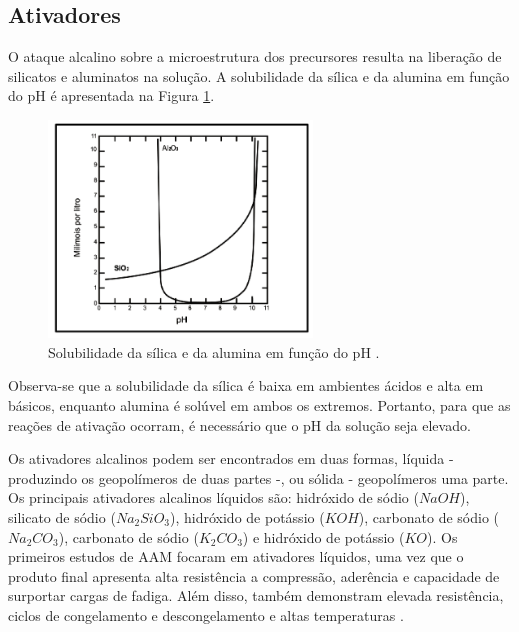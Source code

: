 

\subsection{Ativadores}

O ataque alcalino sobre a microestrutura dos precursores resulta na liberação de silicatos e aluminatos na solução.
A solubilidade da sílica e da alumina em função do pH é apresentada na Figura \ref{fig:solubilidade}.

\begin{figure}[ht]
  \centering
  \includegraphics[width=0.625\textwidth]{Cap2/solubilidade.png}
  \caption{Solubilidade da sílica e da alumina em função do pH \cite{mason1952principles}.}
  \label{fig:solubilidade}
\end{figure}

Observa-se que a solubilidade da sílica é baixa em ambientes ácidos e alta em básicos, enquanto alumina é solúvel em ambos os extremos.
Portanto, para que as reações de ativação ocorram, é necessário que o pH da solução seja elevado.

Os ativadores alcalinos podem ser encontrados em duas formas, líquida - produzindo os geopolímeros de duas partes -, ou sólida - geopolímeros uma parte.
Os principais ativadores alcalinos líquidos são: hidróxido de sódio ($NaOH$), silicato de sódio ($Na_2SiO_3$), hidróxido de potássio ($KOH$), carbonato de sódio ($Na_2CO_3$), carbonato de sódio ($K_2CO_3$) e hidróxido de potássio ($KO$).
Os primeiros estudos de AAM focaram em ativadores líquidos, uma vez que o produto final apresenta alta resistência a compressão, aderência e capacidade de surportar cargas de fadiga. Além disso, também demonstram elevada resistência, ciclos de congelamento e descongelamento e altas temperaturas \cite{heath2014gwp}.

